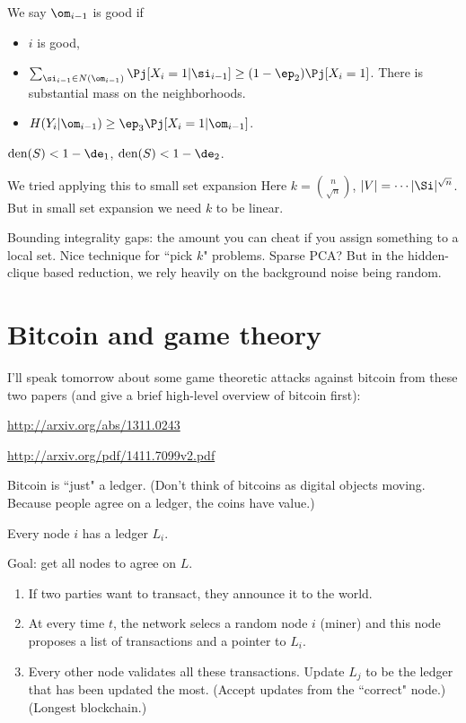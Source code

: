 We say $\om_{i-1}$ is good if 
\begin{itemize}
\item
$i$ is good,
\item
$\sum_{\si_{i-1}\in N(\om_{i-1})} \Pj[X_i=1|\si_{i-1}]\ge (1-\ep_2)\Pj[X_i=1]$.
There is substantial mass on the neighborhoods.
\item
$H(Y_i|\om_{i-1})\ge \ep_3\Pj[X_i=1|\om_{i-1}]$.
\end{itemize}

$\text{den}(S)<1-\de_1$, $\text{den}(S)<1-\de_2$.


We tried applying this to small set expansion Here $k=\binom{n}{\sqrt n}$, $|V|=\cdots |\Si|^{\sqrt n}$. But in small set expansion we need $k$ to be linear.

Bounding integrality gaps: the amount you can cheat if you assign something to a local set. Nice technique for ``pick $k$" problems. Sparse PCA? But in the hidden-clique based reduction, we rely heavily on the background noise being random. 

\section{Bitcoin and game theory}

I'll speak tomorrow about some game theoretic attacks against bitcoin from these two papers (and give a brief high-level overview of bitcoin first):

\url{http://arxiv.org/abs/1311.0243}

\url{http://arxiv.org/pdf/1411.7099v2.pdf}

Bitcoin is ``just" a ledger. (Don't think of bitcoins as digital objects moving. Because people agree on a ledger, the coins have value.)

Every node $i$ has a ledger $L_i$.

Goal: get all nodes to agree on $L$.

%

\begin{enumerate}
\item
If two parties want to transact, they announce it to the world.
\item
At every time $t$, the network selecs a random node $i$ (miner) and this node proposes a list of transactions and a pointer to $L_i$.
\item Every other node validates all these transactions. Update $L_j$ to be the ledger that has been updated the most. (Accept updates from the ``correct" node.) (Longest blockchain.)
\end{enumerate}

